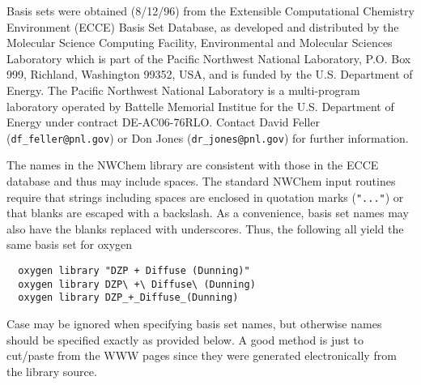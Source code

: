\label{sec:knownbasis}

Basis sets were obtained (8/12/96) from the Extensible Computational
Chemistry Environment (ECCE) Basis Set Database, as developed and distributed
by the Molecular Science Computing Facility, Environmental and
Molecular Sciences Laboratory which is part of the Pacific Northwest
National Laboratory, P.O. Box 999, Richland, Washington 99352, USA,
and is funded by the U.S. Department of Energy.  The Pacific Northwest
National Laboratory is a multi-program laboratory operated by Battelle
Memorial Institue for the U.S. Department of Energy under contract
DE-AC06-76RLO.  Contact David Feller (\verb+df_feller@pnl.gov+) or Don
Jones (\verb+dr_jones@pnl.gov+) for further information.

The names in the NWChem library are consistent with those in the ECCE
database and thus may include spaces.  The standard NWChem input
routines require that strings including spaces are enclosed in
quotation marks (\verb+"..."+) or that blanks are escaped with a
backslash.  As a convenience, basis set names may also have the blanks
replaced with underscores.  Thus, the following all yield the same
basis set for oxygen
\begin{verbatim}
  oxygen library "DZP + Diffuse (Dunning)"
  oxygen library DZP\ +\ Diffuse\ (Dunning)
  oxygen library DZP_+_Diffuse_(Dunning)
\end{verbatim}

Case may be ignored when specifying basis set names, but otherwise
names should be specified exactly as provided below.  A good method is
just to cut/paste from the WWW pages since they were generated
electronically from the library source.

